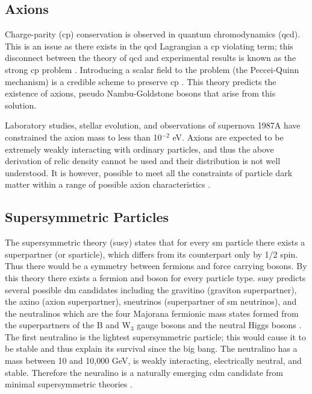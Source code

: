 \subsection{Axions}
Charge-parity (\gls{cp}) conservation is observed in quantum chromodynamics (\gls{qcd}). This is an issue as there exists in the \gls{qcd} Lagrangian a \gls{cp} violating term; this disconnect between the theory of \gls{qcd} and experimental results is known as the strong \gls{cp} problem \cite{SMIntro}. Introducing a scalar field to the problem (the Peccei-Quinn mechanism) is a credible scheme to preserve \gls{cp} \cite{SMIntro}. This theory predicts the existence of axions, pseudo Nambu-Goldstone bosons that arise from this solution.

Laboratory studies, stellar evolution, and observations of supernova 1987A have constrained the axion mass to less than 10$^{-2}$ eV. Axions are expected to be extremely weakly interacting with ordinary particles, and thus the above derivation of relic density cannot be used and their distribution is not well understood. It is however, possible to meet all the constraints of particle dark matter within a range of possible axion characteristics \cite{particlDarkMatterReview}. 

\subsection{Supersymmetric Particles}
\label{Sec:superSymm}
The supersymmetric theory (\gls{susy}) states that for every \gls{sm} particle there exists a superpartner (or sparticle), which differs from its counterpart only by 1/2 spin. Thus there would be a symmetry between fermions and force carrying bosons. By this theory there exists a fermion and boson for every particle type. \gls{susy} predicts several possible \gls{dm} candidates including the gravitino (graviton superpartner), the axino (axion superpartner), sneutrinos \cite{FALK1994Sneutrinos} (superpartner of \gls{sm} neutrinos), and the neutralinos which are the four Majorana fermionic mass states formed from the superpartners of the B and W$_3$ gauge bosons and the neutral Higgs bosons \cite{SMIntro}. The first neutralino is the lightest supersymmetric particle; this would cause it to be stable and thus explain its survival since the big bang. The neutralino has a mass between 10 and 10,000 GeV, is weakly interacting, electrically neutral, and stable. Therefore the neuralino is a naturally emerging \gls{cdm} candidate from minimal supersymmetric theories \cite{MSSM}.


